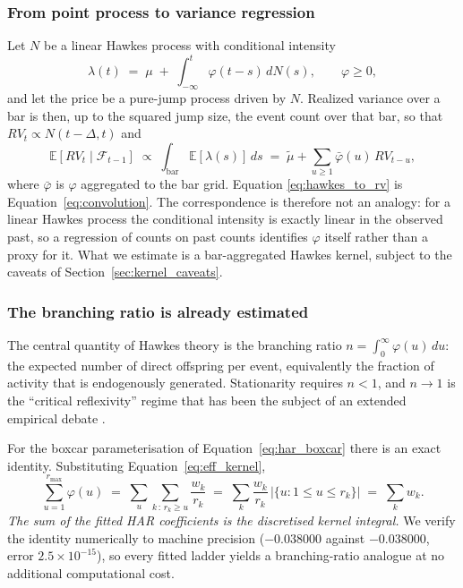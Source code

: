 \subsubsection{From point process to variance regression}

Let $N$ be a linear Hawkes process with conditional intensity
\begin{equation}
  \lambda(t) \;=\; \mu \;+\; \int_{-\infty}^{t}\varphi(t-s)\,dN(s),
  \qquad \varphi \ge 0,
  \label{eq:hawkes_intensity}
\end{equation}
and let the price be a pure-jump process driven by $N$. Realized variance over
a bar is then, up to the squared jump size, the event count over that bar, so
that $RV_t \propto N(t-\Delta, t)$ and
\begin{equation}
  \mathbb{E}\!\left[RV_t \mid \mathcal{F}_{t-1}\right]
  \;\propto\; \int_{\text{bar}} \mathbb{E}[\lambda(s)]\,ds
  \;=\; \tilde{\mu} + \sum_{u \ge 1} \bar{\varphi}(u)\, RV_{t-u},
  \label{eq:hawkes_to_rv}
\end{equation}
where $\bar\varphi$ is $\varphi$ aggregated to the bar grid. Equation
\eqref{eq:hawkes_to_rv} is Equation~\eqref{eq:convolution}. The correspondence
is therefore not an analogy: for a linear Hawkes process the conditional
intensity is exactly linear in the observed past, so a regression of counts on
past counts identifies $\varphi$ itself rather than a proxy for it. What we
estimate is a bar-aggregated Hawkes kernel, subject to the caveats of
Section~\ref{sec:kernel_caveats}.

\subsubsection{The branching ratio is already estimated}

The central quantity of Hawkes theory is the branching ratio
$n = \int_0^\infty \varphi(u)\,du$: the expected number of direct offspring per
event, equivalently the fraction of activity that is endogenously generated.
Stationarity requires $n < 1$, and $n \to 1$ is the ``critical reflexivity''
regime that has been the subject of an extended empirical debate
\citep{HardimanBercotBouchaud2013, FilimonovSornette2012}.

For the boxcar parameterisation of Equation~\eqref{eq:har_boxcar} there is an
exact identity. Substituting Equation~\eqref{eq:eff_kernel},
\begin{equation}
  \sum_{u=1}^{r_{\max}} \varphi(u)
  \;=\; \sum_{u}\sum_{k\,:\,r_k \ge u} \frac{w_k}{r_k}
  \;=\; \sum_k \frac{w_k}{r_k}\,\bigl|\{u : 1 \le u \le r_k\}\bigr|
  \;=\; \sum_k w_k .
  \label{eq:branching_identity}
\end{equation}
\emph{The sum of the fitted HAR coefficients is the discretised kernel
integral.} We verify the identity numerically to machine precision
($-0.038000$ against $-0.038000$, error $2.5 \times 10^{-15}$), so every fitted
ladder yields a branching-ratio analogue at no additional computational cost.

